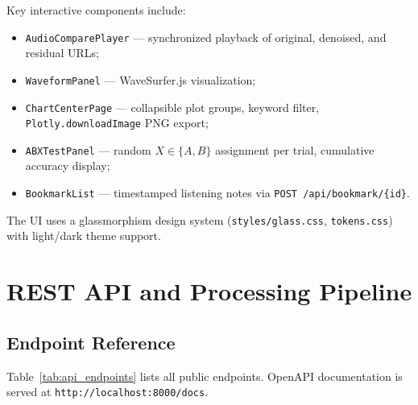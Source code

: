 Key interactive components include:
\begin{itemize}
  \item \texttt{AudioComparePlayer} --- synchronized playback of original, denoised, and residual URLs;
  \item \texttt{WaveformPanel} --- WaveSurfer.js visualization;
  \item \texttt{ChartCenterPage} --- collapsible plot groups, keyword filter, \texttt{Plotly.downloadImage} PNG export;
  \item \texttt{ABXTestPanel} --- random $X\in\{A,B\}$ assignment per trial, cumulative accuracy display;
  \item \texttt{BookmarkList} --- timestamped listening notes via \texttt{POST /api/bookmark/\{id\}}.
\end{itemize}

The UI uses a glassmorphism design system (\texttt{styles/glass.css}, \texttt{tokens.css}) with light/dark theme support.

\section{REST API and Processing Pipeline}
\label{sec:api_workflow}

\subsection{Endpoint Reference}

Table~\ref{tab:api_endpoints} lists all public endpoints. OpenAPI documentation is served at \texttt{http://localhost:8000/docs}.

